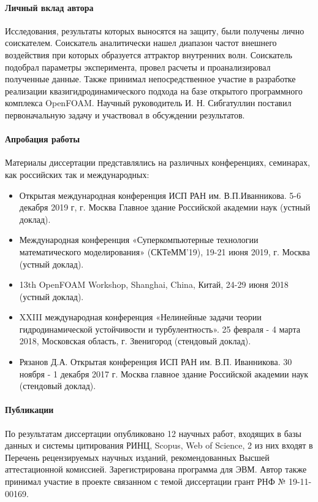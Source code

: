 \documentclass[utf8x]{G7-32} %
\begin{document}
\paragraph{Личный вклад автора}

Исследования, результаты которых выносятся на защиту, были получены лично соискателем. Соискатель аналитически нашел диапазон частот внешнего воздействия при которых образуется аттрактор внутренних волн. Соискатель подобрал параметры эксперимента, провел расчеты и проанализировал полученные данные. Также принимал непосредственное участие в разработке реализации квазигидродинамического подхода на базе открытого программного комплекса OpenFOAM. Научный руководитель И. Н. Сибгатуллин поставил первоначальную задачу и участвовал в обсуждении результатов. 

\paragraph{Апробация работы}

Материалы диссертации представлялись на различных конференциях, семинарах, как российских так и международных:


\begin{itemize}
  \item Открытая международная конференция ИСП РАН им. В.П.Иванникова. 5-6 декабря 2019 г, г. Москва Главное здание Российской академии наук (устный доклад).
  \item Международная конференция «Суперкомпьютерные технологии математического моделирования» (СКТеММ’19), 19-21 июня 2019, г. Москва (устный доклад).
  \item 13th OpenFOAM Workshop, Shanghai, China, Китай, 24-29 июня 2018 (устный доклад).
  \item XXIII международная конференция «Нелинейные задачи теории гидродинамической устойчивости и турбулентность». 25 февраля - 4 марта 2018, Московская область, г. Звенигород (стендовый доклад).
  \item Рязанов Д.А. Открытая конференция ИСП РАН им. В.П. Иванникова. 30 ноября - 1 декабря 2017 г. Москва главное здание Российской академии наук (стендовый доклад).
\end{itemize}

\paragraph{Публикации}

По результатам диссертации опубликовано 12 научных работ, входящих в базы данных и системы цитирования РИНЦ, Scopus, Web of Science, 2 из них входят в Перечень рецензируемых научных изданий, рекомендованных Высшей аттестационной комиссией. Зарегистрирована программа для ЭВМ. Автор также принимал участие в проекте связанном с темой диссертации грант РНФ № 19-11-00169.
\end{document}

